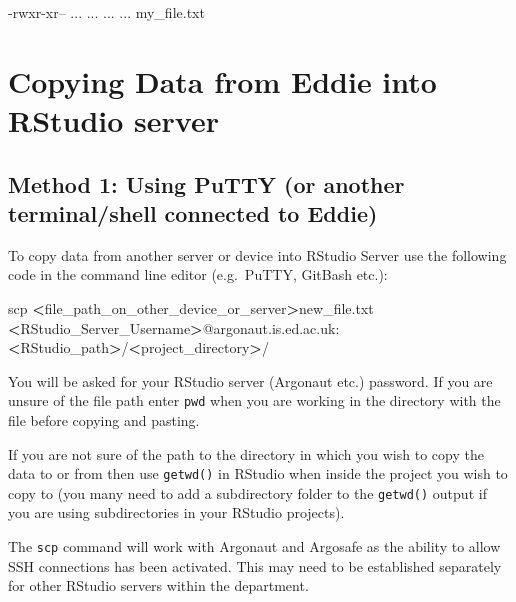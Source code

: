 \documentclass[
]{book}
\newenvironment{Shaded}{\begin{snugshade}}{\end{snugshade}}
\newcommand{\ExtensionTok}[1]{#1}
\newcommand{\FunctionTok}[1]{\textcolor[rgb]{0.00,0.00,0.00}{#1}}
\newcommand{\NormalTok}[1]{#1}
\newcommand{\OperatorTok}[1]{\textcolor[rgb]{0.81,0.36,0.00}{\textbf{#1}}}
\begin{document}
\begin{Shaded}
\begin{Highlighting}[]
\ExtensionTok{-rwxr-xr--}\NormalTok{ ... ... ... ... my_file.txt}
\end{Highlighting}
\end{Shaded}

\hypertarget{copying-data-from-eddie-into-rstudio-server}{%
\section{Copying Data from Eddie into RStudio server}\label{copying-data-from-eddie-into-rstudio-server}}

\hypertarget{method-1-using-putty-or-another-terminalshell-connected-to-eddie}{%
\subsection{Method 1: Using PuTTY (or another terminal/shell connected to Eddie)}\label{method-1-using-putty-or-another-terminalshell-connected-to-eddie}}

To copy data from another server or device into RStudio Server use the following code in the command line editor (e.g.~PuTTY, GitBash etc.):

\begin{Shaded}
\begin{Highlighting}[]
\FunctionTok{scp} \OperatorTok{<}\NormalTok{file_path_on_other_device_or_server}\OperatorTok{>}\NormalTok{new_file.txt }\OperatorTok{<}\NormalTok{RStudio_Server_Username}\OperatorTok{>}\NormalTok{@argonaut.is.ed.ac.uk:}\OperatorTok{<}\NormalTok{RStudio_path}\OperatorTok{>}\NormalTok{/}\OperatorTok{<}\NormalTok{project_directory}\OperatorTok{>}\NormalTok{/}
\end{Highlighting}
\end{Shaded}

You will be asked for your RStudio server (Argonaut etc.) password. If you are unsure of the file path enter \texttt{pwd} when you are working in the directory with the file before copying and pasting.

If you are not sure of the path to the directory in which you wish to copy the data to or from then use \texttt{getwd()} in RStudio when inside the project you wish to copy to (you many need to add a subdirectory folder to the \texttt{getwd()} output if you are using subdirectories in your RStudio projects).

The \texttt{scp} command will work with Argonaut and Argosafe as the ability to allow SSH connections has been activated. This may need to be established separately for other RStudio servers within the department.
\end{document}
